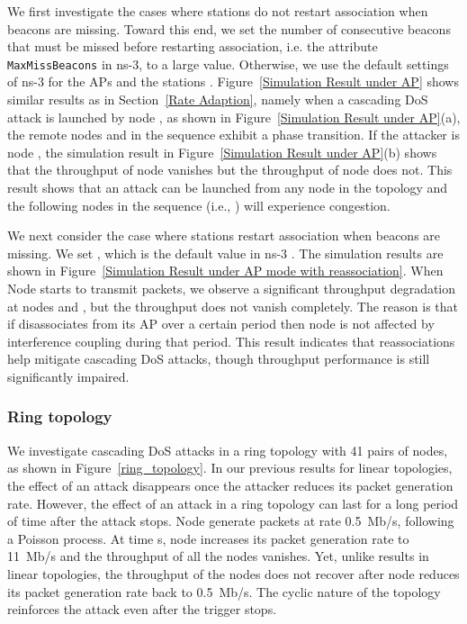 \documentclass{IEEEtran}
\begin{document}
We first investigate the cases where stations do not restart association when beacons are missing.
Toward this end, we set the number of consecutive beacons that must be missed before restarting association, i.e. the attribute {\tt MaxMissBeacons} in ns-3, to a large value.
Otherwise, we use the default settings of ns-3 for the APs \cite{ns3ap} and the stations \cite{ns3sta}. Figure~\ref{Simulation Result under
AP} shows similar results as
in Section~\ref{Rate Adaption}, namely when a cascading DoS attack is launched by node , as shown in Figure~\ref{Simulation Result under AP}(a),
the remote nodes  and  in the sequence exhibit a phase transition.
If the attacker is node , the simulation result in Figure~\ref{Simulation Result under AP}(b) shows that the throughput of node
 vanishes but the throughput of node  does not. This result shows that an attack can be launched from any node  in the topology
and the following nodes in the sequence (i.e., ) will experience congestion.


We next consider the case where stations restart association when beacons are missing. We set
, which is the default value in ns-3 \cite{ns3sta}. The simulation results are shown in Figure~\ref{Simulation Result under AP mode with reassociation}. When Node  starts to transmit packets, we observe a significant throughput degradation at nodes  and , but
the throughput does not vanish completely. The reason is that if  disassociates from its AP  over a certain period
then node  is not affected by interference coupling during that period. This result indicates that reassociations help mitigate cascading DoS attacks, though throughput performance is still significantly impaired.


\subsubsection{Ring topology}
\label{Ring topology}
We investigate cascading DoS attacks in a ring topology with 41 pairs of nodes, as shown in Figure~\ref{ring_topology}. In our previous results for
linear topologies, the effect of an attack disappears once the attacker reduces its packet generation rate. However, the effect of an attack in a
ring topology can last for a long period of time after the attack stops.
Node   generate packets at rate 0.5~Mb/s, following a Poisson process. At time  s, node  increases its packet generation rate to 11~Mb/s and the
throughput of all the nodes vanishes. Yet, unlike results in linear topologies, the throughput of the nodes does not recover after node 
reduces its packet generation rate back to 0.5~Mb/s. The cyclic nature of the topology reinforces the attack even after the trigger stops.
\end{document}

